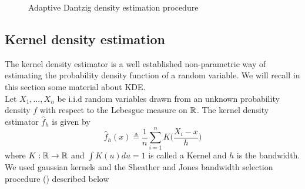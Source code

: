 \begin{figure}[H]
\begin{center}
   \caption{Adaptive Dantzig density estimation procedure}
   \label{algo:ad_algo}
\end{center}
\vspace{-15pt}
\end{figure}


\subsection{Kernel density estimation}

The kernel density estimator is a well established non-parametric way of estimating the probability density function of a random variable. We will recall in this section some material about KDE.\\
Let $X_1,\dots,X_n$ be i.i.d random variables drawn from an unknown probability density $f$ with respect to the Lebesgue measure on ${\mathbb R}$. The kernel density estimator $\hat f_h $ is given by
\begin{equation}
	\hat f_h(x) \triangleq \frac{1}{n}\sum_{i=1}^nK\Big(\frac{X_i-x}{h}\Big)
\end{equation}
where $K:{\mathbb R} \rightarrow {\mathbb R}$ and $\int K(u)du = 1$ is called a Kernel and $h$ is the bandwidth. We used gaussian kernels and the Sheather and Jones bandwidth selection procedure (\cite{sheather_bdwth}) described below

